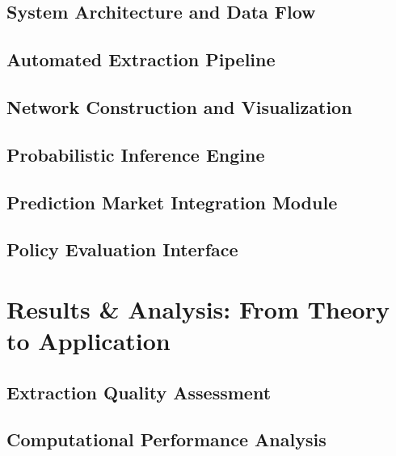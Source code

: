 \documentclass[
  letterpaper,
]{book}
\begin{document}
\subsection{System Architecture and Data
Flow}\label{system-architecture-and-data-flow}

\subsection{Automated Extraction
Pipeline}\label{automated-extraction-pipeline}

\subsection{Network Construction and
Visualization}\label{network-construction-and-visualization}

\subsection{Probabilistic Inference
Engine}\label{probabilistic-inference-engine}

\subsection{Prediction Market Integration
Module}\label{prediction-market-integration-module}

\subsection{Policy Evaluation
Interface}\label{policy-evaluation-interface}

\section{Results \& Analysis: From Theory to
Application}\label{results-analysis-from-theory-to-application}

\subsection{Extraction Quality
Assessment}\label{extraction-quality-assessment}

\subsection{Computational Performance
Analysis}\label{computational-performance-analysis}
\end{document}
